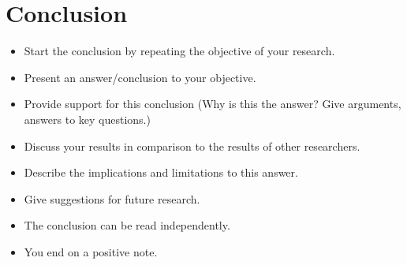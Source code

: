\chapter{Conclusion}
\label{chapter:conclusion}

\begin{itemize}
    \item Start the conclusion by repeating the objective of your research.
    \item Present an answer/conclusion to your objective.
    \item Provide support for this conclusion (Why is this the answer? Give arguments, answers to key questions.)
    \item Discuss your results in comparison to the results of other researchers.
    \item Describe the implications and limitations to this answer.
    \item Give suggestions for future research.
    \item The conclusion can be read independently.
    \item You end on a positive note.
\end{itemize}